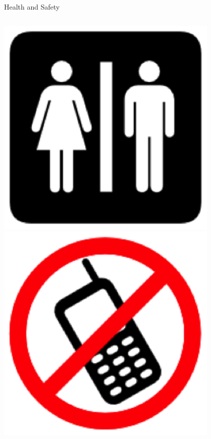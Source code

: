 \documentclass{beamer}
\begin{document}
\begin{frame}{Health and Safety}
\begin{columns}[c]
\begin{column}{0.33\textwidth}
\begin{center}
\includegraphics[width=0.8\textwidth,height=0.5\textheight,keepaspectratio]{imgs/health-safety-3.png}\\
\includegraphics[width=0.8\textwidth,height=0.5\textheight,keepaspectratio]{imgs/health-safety-6.png}
\end{center}
\end{column}
\end{columns}
\end{frame}
\end{document}
